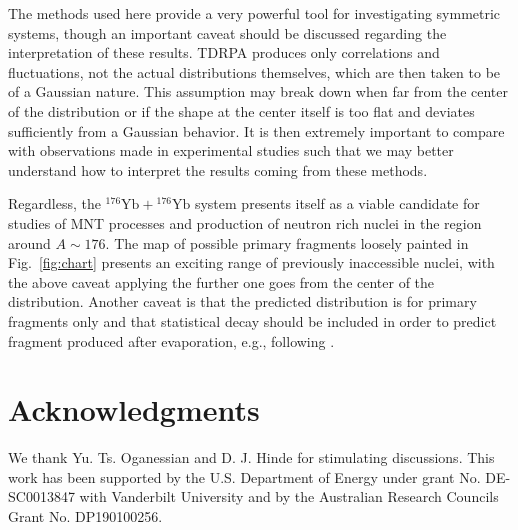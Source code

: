 The methods used here provide a very powerful tool for investigating symmetric systems, though an important caveat should be discussed regarding the interpretation of these results.
TDRPA produces only correlations and fluctuations, not the actual distributions themselves, which are then taken to be of a Gaussian nature.
This assumption may break down when far from the center of the distribution or if the shape at the center itself is too flat and deviates sufficiently from a Gaussian behavior.
It is then extremely important to compare with observations made in experimental studies such that we may better understand how to interpret the results coming from these methods.

Regardless, the $^{176}\mathrm{Yb}+{}^{176}\mathrm{Yb}$ system presents itself as a viable candidate for studies of MNT processes and production of neutron rich nuclei in the region around $A\sim176$.
The map of possible primary fragments loosely painted in Fig.~\ref{fig:chart} presents an exciting range of previously inaccessible nuclei, with the above caveat applying the further one goes from the center of the distribution.
Another caveat is that the predicted distribution is for primary fragments only and that statistical decay should be included in order to predict fragment produced after evaporation, e.g., following \citep{sekizawa2017,umar2017,wu2019}.


\section*{Acknowledgments}
	We thank Yu. Ts. Oganessian and D. J. Hinde for stimulating discussions.
	This work has been supported by the U.S. Department of Energy under grant No.
	DE-SC0013847 with Vanderbilt University and by the
	Australian Research Councils Grant No. DP190100256.



\clearpage

